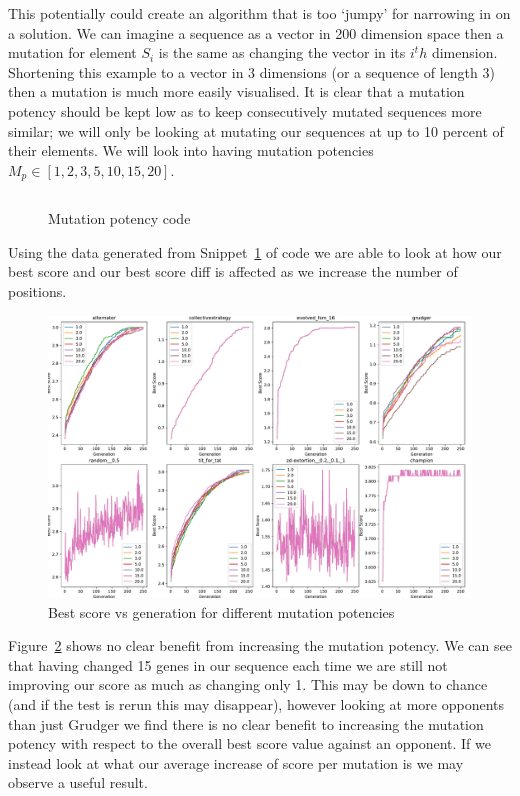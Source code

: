 This potentially could create an algorithm that is too `jumpy' for narrowing in on a solution.
We can imagine a sequence as a vector in 200 dimension space then a mutation for element \(S_i\) is the same as changing the vector in its \(i^th\) dimension.
Shortening this example to a vector in 3 dimensions (or a sequence of length 3) then a mutation is much more easily visualised.
It is clear that a mutation potency should be kept low as to keep consecutively mutated sequences more similar;
we will only be looking at mutating our sequences at up to 10 percent of their elements.
We will look into having mutation potencies \(M_p \in [1,2,3,5,10,15,20]\).

\begin{figure}
    \inputminted{python}{code_snippets/mutationPotencyChecker.py}
    \caption{Mutation potency code}\label{code:mutationPotencyChecker}
\end{figure}

Using the data generated from Snippet~\ref{code:mutationPotencyChecker} of code we are able to look at how our best score and our best score diff is affected as we increase the number of positions.

\begin{figure}[ht]
    \includegraphics[width=1.0\textwidth, center]{./img/plots/MUT_POT_bs_v_gen_all.pdf}
    \caption{Best score vs generation for different mutation potencies}\label{fig:MUT-POT-bs-v-gen-all}
\end{figure}

Figure~\ref{fig:MUT-POT-bs-v-gen-all} shows no clear benefit from increasing the mutation potency.
We can see that having changed 15 genes in our sequence each time we are still not improving our score as much as changing only 1.
This may be down to chance (and if the test is rerun this may disappear), however looking at more opponents than just Grudger we find there is no clear benefit to increasing the mutation potency with respect to the overall best score value against an opponent.
If we instead look at what our average increase of score per mutation is we may observe a useful result.


